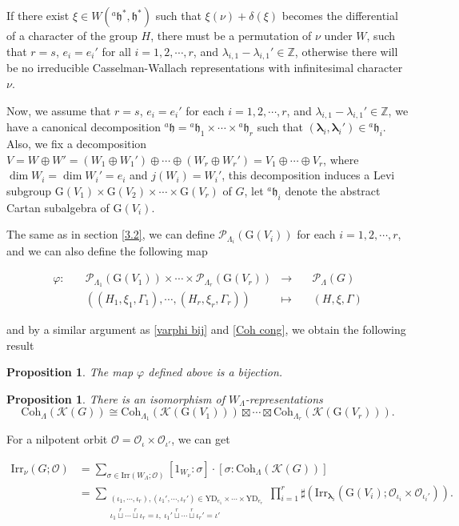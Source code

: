 \documentclass[12pt, a4paper]{amsart}
\numberwithin{equation}{section}
\newtheorem{prop}[thm]{Proposition}
\newcommand{\blam}{{\boldsymbol{\lambda}}}
\newcommand{\BZ}{{\mathbb {Z}}}
\newcommand{\CK}{{\mathcal {K}}}
\newcommand{\CO}{{\mathcal {O}}}
\newcommand{\CP}{{\mathcal {P}}}
\newcommand{\fh}{\mathfrak{h}}
\newcommand{\G}{{\mathrm{G}}}
\newcommand{\Irr}{{\mathrm{Irr}}}
\newcommand{\defmap}[5]{
           \begin{equation*}
              \begin{aligned}
                   #1:\quad  & #2 &\longrightarrow &\quad #3 \\
                      \quad  & #4    &\longmapsto  &\quad #5
              \end{aligned}
           \end{equation*}
          }
\begin{document}
If there exist $\xi \in W({^{a}\fh^*},\fh^*)$ such that $\xi(\nu) + \delta(\xi)$ becomes the differential of a character of the group $H$, there must be a permutation of $\nu$ under $W$, such that $r = s$, $e_i = e_i'$ for all $i = 1,2,\cdots,r$, and $\lambda_{i,1} - \lambda_{i,1}' \in \BZ$, otherwise there will be no irreducible Casselman-Wallach representations with infinitesimal character $\nu$.

Now, we assume that $r = s$, $e_i = e_i'$ for each $i =1,2,\cdots,r$, and $\lambda_{i,1} - \lambda_{i,1}' \in \BZ$, we have a canonical decomposition $^{a}\fh = {^{a}\fh_1} \times \cdots \times {^{a}\fh_r}$ such that $(\blam_i, \blam_i')\in {^{a}\fh_i}$. Also, we fix a decomposition $V = W \oplus W' = (W_1 \oplus W_1') \oplus \cdots \oplus (W_r \oplus W_r') = V_1 \oplus \cdots \oplus V_r$, where $\dim W_i = \dim W_i' = e_i$ and $j(W_i) = W_i'$, this decomposition induces a Levi subgroup $\G(V_1) \times \G (V_2) \times \cdots \times \G(V_r)$ of $G$, let $^{a}\fh_i$ denote the abstract Cartan subalgebra of $\G(V_i)$. 

The same as in section \ref{3.2}, we can define $\CP_{\Lambda_i}(\G(V_i))$ for each $i = 1,2,\cdots,r$, and we can also define the following map
\defmap{\varphi}{\CP_{\Lambda_1}(\G(V_1))\times \cdots \times \CP_{\Lambda_r}(\G(V_r))}{\CP_{\Lambda}(G)}{((H_1,\xi_1,\Gamma_1),\cdots, (H_r,\xi_r,\Gamma_r))}{(H,\xi,\Gamma)}
and by a similar argument as \ref{varphi bij} and \ref{Coh cong}, we obtain the following result
\begin{prop}
    The map $\varphi$ defined above is a bijection.
\end{prop}

\begin{prop}
    There is an isomorphism of $W_{\Lambda}$-representations
    \begin{equation}
        \mathrm{Coh}_{\Lambda}(\CK(G)) \cong \mathrm{Coh}_{\Lambda_1}(\CK(\G(V_1))) \boxtimes \cdots \boxtimes \mathrm{Coh}_{\Lambda_r}(\CK(\G(V_r))).
    \end{equation}
\end{prop}

For a nilpotent orbit $\CO = \CO_{\iota} \times \CO_{\iota'}$, we can get

\begin{align}
    \Irr_{\nu}(G;\CO) & = \sum_{\sigma \in \Irr(W_{\Lambda};\CO)}[1_{W_\nu}:\sigma]\cdot[\sigma: \mathrm{Coh}_{\Lambda}(\CK(G))]\\
    & = \sum_{\substack{(\iota_1,\cdots,\iota_r), (\iota_1',\cdots,\iota_r') \in \mathrm{YD}_{e_1} \times \cdots \times \mathrm{YD}_{e_r}\\ \iota_1 \mathop{\sqcup}\limits^r \cdots \mathop{\sqcup}\limits^r \iota_r = \iota, \ \iota_1'  \mathop{\sqcup}\limits^r \cdots \mathop{\sqcup}\limits^r \iota_r' = \iota' }} \prod_{i=1}^{r} \sharp(\Irr_{\blam_i}(\G(V_i);\CO_{\iota_i} \times \CO_{\iota_i'})).
\end{align}
\end{document}
